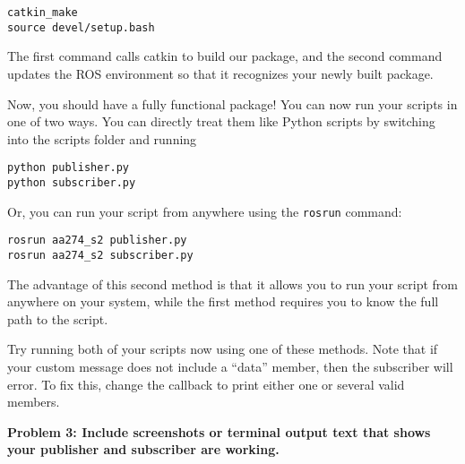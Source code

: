 \begin{lstlisting}
catkin_make
source devel/setup.bash
\end{lstlisting}

The first command calls catkin to build our package, and the second command updates the ROS environment so that it recognizes your newly built package.

Now, you should have a fully functional package! You can now run your scripts in one of two ways. You can directly treat them like Python scripts by switching into the scripts folder and running 

\begin{lstlisting}
python publisher.py
python subscriber.py
\end{lstlisting}

Or, you can run your script from anywhere using the \texttt{rosrun} command:

\begin{lstlisting}
rosrun aa274_s2 publisher.py
rosrun aa274_s2 subscriber.py
\end{lstlisting}
The advantage of this second method is that it allows you to run your script from anywhere on your system, while the first method requires you to know the full path to the script.

Try running both of your scripts now using one of these methods. Note that if your custom message does not include a ``data'' member, then the subscriber will error. To fix this, change the callback to print either one or several valid members.

\textbf{Problem 3: Include screenshots or terminal output text that shows your publisher and subscriber are working.}




